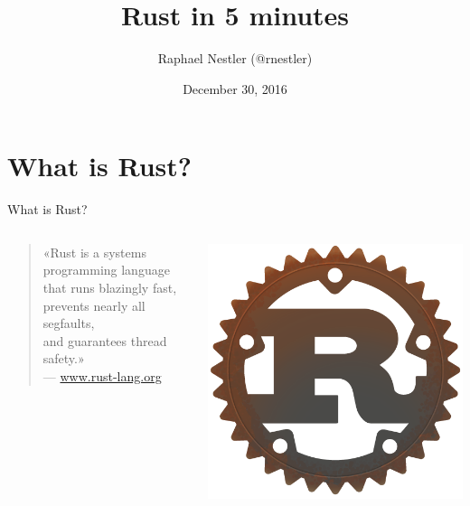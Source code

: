 \documentclass[aspectratio=1610,t]{beamer}
\title{Rust in 5 minutes}
\date{December 30, 2016}
\author{Raphael Nestler (@rnestler)}
\institute{Coredump Hackerspace Rapperswil, Switzerland}
\begin{document}
\maketitle



\section{What is Rust?}

\begin{frame}[c]{What is Rust?}
  \begin{columns}[onlytextwidth]
    \begin{column}{.8\textwidth}
      \begin{quote}
        «Rust is a systems programming language\\
        that runs blazingly fast, prevents nearly all segfaults,\\
        and guarantees thread safety.»\\
        \vspace{0.5em}
        {\normalfont \small --- \url{www.rust-lang.org}}
      \end{quote}
    \end{column}
    \begin{column}{.2\textwidth}
      \includegraphics[width=\textwidth]{./rust-logo-512x512.png}
    \end{column}
  \end{columns}
\end{frame}
\end{document}
